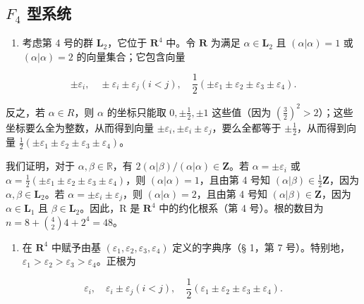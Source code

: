 \subsection{\texorpdfstring{\(F_{4}\) 型系统}{F\_4 型系统}}

\begin{enumerate}
\def\labelenumi{(\Roman{enumi})}
\tightlist
\item
  考虑第 4 号的群 \(\mathbf{L}_2\)，它位于 \(\mathbf{R}^4\) 中。令 \(\mathbf{R}\) 为满足 \(\alpha \in \mathbf{L}_2\) 且 \((\alpha |\alpha) = 1\) 或 \((\alpha |\alpha) = 2\) 的向量集合；它包含向量
\end{enumerate}

\[
\pm \varepsilon_ {i}, \quad \pm \varepsilon_ {i} \pm \varepsilon_ {j} (i <   j), \quad \frac {1}{2} (\pm \varepsilon_ {1} \pm \varepsilon_ {2} \pm \varepsilon_ {3} \pm \varepsilon_ {4}).
\]

反之，若 \(\alpha\in R\)，则 \(\alpha\) 的坐标只能取 \(0,\pm\frac{1}{2},\pm1\) 这些值（因为 \((\frac{3}{2})^{2}>2\)）；这些坐标要么全为整数，从而得到向量 \(\pm\varepsilon_{i},\pm\varepsilon_{i}\pm\varepsilon_{j}\)，要么全都等于 \(\pm\frac{1}{2}\)，从而得到向量 \(\frac{1}{2}(\pm\varepsilon_{1}\pm\varepsilon_{2}\pm\varepsilon_{3}\pm\varepsilon_{4})\)。

我们证明，对于 \(\alpha, \beta \in \mathbb{R}\)，有 \(2(\alpha|\beta) / (\alpha|\alpha) \in \mathbf{Z}\)。若 \(\alpha = \pm \varepsilon_i\) 或 \(\alpha = \frac{1}{2} (\pm \varepsilon_1 \pm \varepsilon_2 \pm \varepsilon_3 \pm \varepsilon_4)\)，则 \((\alpha|\alpha) = 1\)，且由第 4 号知 \((\alpha|\beta) \in \frac{1}{2}\mathbf{Z}\)，因为 \(\alpha, \beta \in \mathbf{L}_2\)。若 \(\alpha = \pm \varepsilon_i \pm \varepsilon_j\)，则 \((\alpha|\alpha) = 2\)，且由第 4 号知 \((\alpha|\beta) \in \mathbf{Z}\)，因为 \(\alpha \in \mathbf{L}_1\) 且 \(\beta \in \mathbf{L}_2\)。因此，R 是 \(\mathbf{R}^4\) 中的约化根系（第 4 号）。根的数目为 \(n = 8 + \binom{4}{2} 4 + 2^4 = 48\)。

\begin{enumerate}
\def\labelenumi{(\Roman{enumi})}
\setcounter{enumi}{1}
\tightlist
\item
  在 \(\mathbf{R}^4\) 中赋予由基 \((\varepsilon_1, \varepsilon_2, \varepsilon_3, \varepsilon_4)\) 定义的字典序（§ 1，第 7 号）。特别地，\(\varepsilon_1 > \varepsilon_2 > \varepsilon_3 > \varepsilon_4\)。正根为
\end{enumerate}

\[
\varepsilon_ {i}, \quad \varepsilon_ {i} \pm \varepsilon_ {j} (i <   j), \quad \frac {1}{2} (\varepsilon_ {1} \pm \varepsilon_ {2} \pm \varepsilon_ {3} \pm \varepsilon_ {4}).
\]

